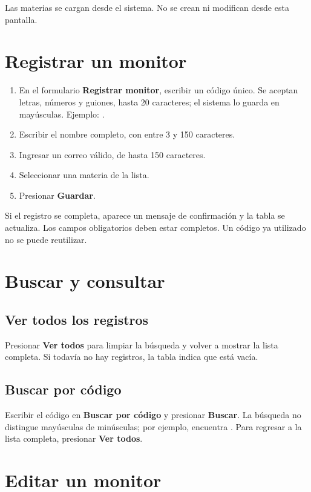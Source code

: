 Las materias se cargan desde el sistema. No se crean ni modifican desde esta pantalla.

\section{Registrar un monitor}

\begin{enumerate}
  \item En el formulario \textbf{Registrar monitor}, escribir un código único. Se aceptan letras, números y guiones, hasta 20 caracteres; el sistema lo guarda en mayúsculas. Ejemplo: .
  \item Escribir el nombre completo, con entre 3 y 150 caracteres.
  \item Ingresar un correo válido, de hasta 150 caracteres.
  \item Seleccionar una materia de la lista.
  \item Presionar \textbf{Guardar}.
\end{enumerate}

Si el registro se completa, aparece un mensaje de confirmación y la tabla se actualiza. Los campos obligatorios deben estar completos. Un código ya utilizado no se puede reutilizar.

\section{Buscar y consultar}

\subsection{Ver todos los registros}

Presionar \textbf{Ver todos} para limpiar la búsqueda y volver a mostrar la lista completa. Si todavía no hay registros, la tabla indica que está vacía.

\subsection{Buscar por código}

Escribir el código en \textbf{Buscar por código} y presionar \textbf{Buscar}. La búsqueda no distingue mayúsculas de minúsculas; por ejemplo,  encuentra . Para regresar a la lista completa, presionar \textbf{Ver todos}.

\section{Editar un monitor}

